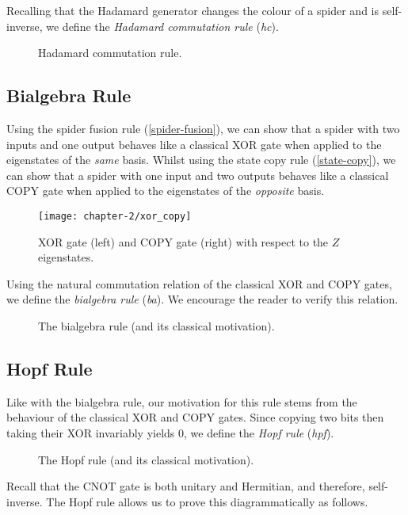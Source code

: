 Recalling that the Hadamard generator changes the colour of a spider and is self-inverse, we define the \textit{Hadamard commutation rule} (\textit{hc}).

\begin{figure}[H]
    \centering
    \caption{Hadamard commutation rule.}
    \label{hadamard-commutation}
\end{figure}


\subsection{Bialgebra Rule}

Using the spider fusion rule (\ref{spider-fusion}), we can show that a spider with two inputs and one output behaves like a classical XOR gate when applied to the eigenstates of the \textit{same} basis. Whilst using the state copy rule (\ref{state-copy}), we can show that a spider with one input and two outputs behaves like a classical COPY gate when applied to the eigenstates of the \textit{opposite} basis.

\begin{figure}[H]
    \centering
    \texttt{[image: chapter-2/xor\_copy]}
    \caption{XOR gate (left) and COPY gate (right) with respect to the $Z$ eigenstates.}
    \label{xor}
    \label{copy}
\end{figure}

Using the natural commutation relation of the classical XOR and COPY gates, we define the \textit{bialgebra rule} (\textit{ba}). We encourage the reader to verify this relation.

\begin{figure}[H]
    \centering
    \caption{The bialgebra rule (and its classical motivation).}
    \label{bialgebra}
\end{figure}


\subsection{Hopf Rule}

Like with the bialgebra rule, our motivation for this rule stems from the behaviour of the classical XOR and COPY gates. Since copying two bits then taking their XOR invariably yields 0, we define the \textit{Hopf rule} (\textit{hpf}).

\begin{figure}[H]
    \centering
    \caption{The Hopf rule (and its classical motivation).}
    \label{hopf}
\end{figure}

Recall that the CNOT gate is both unitary and Hermitian, and therefore, self-inverse. The Hopf rule allows us to prove this diagrammatically as follows.

